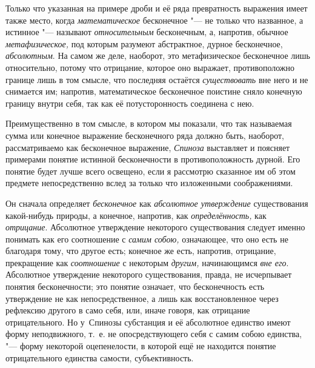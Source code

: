 Только что указанная на примере дроби и её ряда превратность выражения имеет
также место, когда {\em математическое} бесконечное "--- не только что
названное, а истинное "--- называют {\em относительным} бесконечным, а,
напротив, обычное {\em метафизическое,} под которым разумеют абстрактное,
дурное бесконечное, {\em абсолютным}. На самом же деле, наоборот, это
метафизическое бесконечное лишь относительно, потому что отрицание, которое оно
выражает, противоположно границе лишь в том смысле, что последняя остаётся
{\em существовать} вне него и не снимается им; напротив, математическое
бесконечное поистине сняло конечную границу внутри себя, так как её
потусторонность соединена с нею.\label{bkm:bm52b}

Преимущественно в том смысле, в котором мы показали, что так называемая сумма
или конечное выражение бесконечного ряда должно быть, наоборот, рассматриваемо
как бесконечное выражение, {\em Спиноза} выставляет и поясняет примерами
понятие истинной бесконечности в противоположность дурной. Его понятие будет
лучше всего освещено, если я рассмотрю сказанное им об этом предмете
непосредственно вслед за только что изложенными соображениями.

Он сначала определяет {\em бесконечное} как {\em абсолютное утверждение}
существования какой-нибудь природы, а конечное, напротив, как
{\em определённость,} как {\em отрицание}. Абсолютное утверждение некоторого
существования следует именно понимать как его соотношение с {\em самим собою,}
означающее, что оно есть не благодаря тому, что другое есть; конечное же есть,
напротив, отрицание, прекращение как {\em соотношение} с некоторым
{\em другим,} начинающимся {\em вне его}. Абсолютное утверждение некоторого
существования, правда, не исчерпывает понятия бесконечности; это понятие
означает, что бесконечность есть утверждение не как непосредственное, а лишь
как восстановленное через рефлексию другого в само себя, или, иначе говоря, как
отрицание отрицательного. Но у~Спинозы субстанция и её абсолютное единство
имеют форму неподвижного, т.~е. не опосредствующего себя с самим собою
единства, "--- форму некоторой оцепенелости, в которой ещё не находится понятие
отрицательного единства самости, субъективность.

